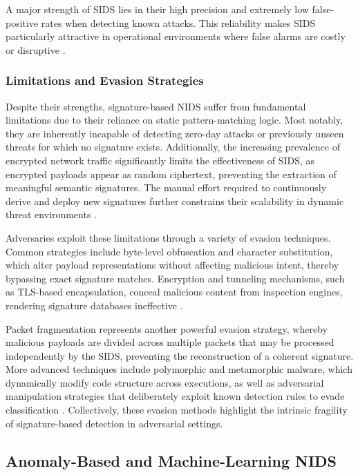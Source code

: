 A major strength of SIDS lies in their high precision and extremely low false-positive rates when detecting known attacks. This reliability makes SIDS particularly attractive in operational environments where false alarms are costly or disruptive \cite{ahmed2025signature}. 

\subsubsection{Limitations and Evasion Strategies}

Despite their strengths, signature-based NIDS suffer from fundamental limitations due to their reliance on static pattern-matching logic. Most notably, they are inherently incapable of detecting zero-day attacks or previously unseen threats for which no signature exists. Additionally, the increasing prevalence of encrypted network traffic significantly limits the effectiveness of SIDS, as encrypted payloads appear as random ciphertext, preventing the extraction of meaningful semantic signatures. The manual effort required to continuously derive and deploy new signatures further constrains their scalability in dynamic threat environments \cite{hashemi2020enhancing, cui2023cbseq, doriguzzi2020lucid}.

Adversaries exploit these limitations through a variety of evasion techniques. Common strategies include byte-level obfuscation and character substitution, which alter payload representations without affecting malicious intent, thereby bypassing exact signature matches. Encryption and tunneling mechanisms, such as TLS-based encapsulation, conceal malicious content from inspection engines, rendering signature databases ineffective \cite{khorshidpour2018domain, vitorino2023sok}. 

Packet fragmentation represents another powerful evasion strategy, whereby malicious payloads are divided across multiple packets that may be processed independently by the SIDS, preventing the reconstruction of a coherent signature. More advanced techniques include polymorphic and metamorphic malware, which dynamically modify code structure across executions, as well as adversarial manipulation strategies that deliberately exploit known detection rules to evade classification \cite{wang2023evasion, alasad2026comprehensive}. Collectively, these evasion methods highlight the intrinsic fragility of signature-based detection in adversarial settings.

\subsection{Anomaly-Based and Machine-Learning NIDS}

